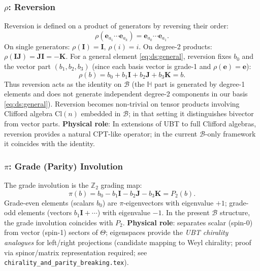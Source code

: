 \documentclass[12pt,a4paper]{article}
\theoremstyle{definition}
\theoremstyle{remark}
\begin{document}
\subsubsection{$\rho$: Reversion}

Reversion is defined on a product of generators by reversing their order:
\begin{equation}
  \rho(\mathbf{e}_{a_1}\cdots\mathbf{e}_{a_k})
  = \mathbf{e}_{a_k}\cdots\mathbf{e}_{a_1}.
  \label{eq:ds:reversion}
\end{equation}
On single generators: $\rho(\mathbf{I})=\mathbf{I}$, $\rho(i)=i$.
On degree-2 products: $\rho(\mathbf{I}\mathbf{J}) = \mathbf{J}\mathbf{I} = -\mathbf{K}$.
For a general element \eqref{eq:ds:general}, reversion fixes $b_0$ and
the vector part $(b_1,b_2,b_3)$ (since each basis vector is grade-1 and
$\rho(\mathbf{e})=\mathbf{e}$):
\begin{equation}
  \rho(b) = b_0 + b_1\mathbf{I} + b_2\mathbf{J} + b_3\mathbf{K} = b.
  \label{eq:ds:reversion_on_B}
\end{equation}
Thus reversion acts as the identity on $\mathcal{B}$
(the $\mathbb{H}$ part is generated by degree-1 elements and does not
generate independent degree-2 components in our basis \eqref{eq:ds:general}).
Reversion becomes non-trivial on tensor products involving Clifford algebra
$\mathrm{Cl}(n)$ embedded in $\mathcal{B}$; in that setting it distinguishes
bivector from vector parts.
\textbf{Physical role}: In extensions of UBT to full Clifford algebras,
reversion provides a natural CPT-like operator; in the current
$\mathcal{B}$-only framework it coincides with the identity.

\subsubsection{$\pi$: Grade (Parity) Involution}

The grade involution is the $\mathbb{Z}_2$ grading map:
\begin{equation}
  \pi(b) = b_0 - b_1\mathbf{I} - b_2\mathbf{J} - b_3\mathbf{K} = P_2(b).
  \label{eq:ds:grade}
\end{equation}
Grade-even elements (scalars $b_0$) are $\pi$-eigenvectors with eigenvalue $+1$;
grade-odd elements (vectors $b_1\mathbf{I}+\cdots$) with eigenvalue $-1$.
In the present $\mathcal{B}$ structure, the grade involution coincides
with $P_2$.
\textbf{Physical role}: separates scalar (spin-0) from vector (spin-1) sectors
of $\Theta$; eigenspaces provide the \emph{UBT chirality analogues} for
left/right projections (candidate mapping to Weyl chirality; proof via
spinor/matrix representation required;
see \texttt{chirality\_and\_parity\_breaking.tex}).
\end{document}
